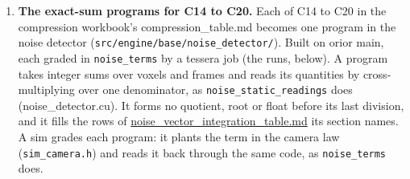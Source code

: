 \begin{enumerate}
\begin{itemize}
\item Reservation rule: “We reserve what they ask for and then if it cost less we remember that for next time”. tessera\_\allowbreak{}ledger\_\allowbreak{}wants is still in the working tree, waiting on his clarification. Not reverted.
\end{itemize}
\item \textbf{The exact-sum programs for C14 to C20.} Each of C14 to C20 in the compression workbook's compression\_\allowbreak{}table.md becomes one program in the noise detector (\texttt{src/\allowbreak{}engine/\allowbreak{}base/\allowbreak{}noise\_\allowbreak{}detector/\allowbreak{}}). Built on orior main, each graded in \texttt{noise\_\allowbreak{}terms} by a tessera job (the runs, below). A program takes integer sums over voxels and frames and reads its quantities by cross-multiplying over one denominator, as \texttt{noise\_\allowbreak{}static\_\allowbreak{}readings} does (noise\_\allowbreak{}detector.cu). It forms no quotient, root or float before its last division, and it fills the rows of \hyperref[chap:noise-vector-integration-table]{noise\_\allowbreak{}vector\_\allowbreak{}integration\_\allowbreak{}table.md} its section names. A sim grades each program: it plants the term in the camera law (\texttt{sim\_\allowbreak{}camera.\allowbreak{}h}) and reads it back through the same code, as \texttt{noise\_\allowbreak{}terms} does.


\end{enumerate}
